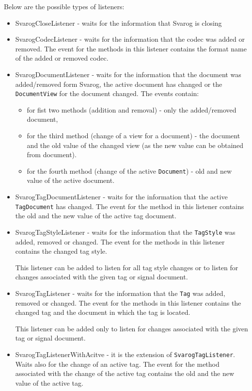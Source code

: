 \documentclass{article}
\begin{document}
Below are the possible types of listeners:
\begin{itemize}
	\item SvarogCloseListener - waits for the information that Svarog is closing
	\item SvarogCodecListener - waits for the information that the codec was added or removed.
		The event for the methods in this listener contains the format name of the added or removed codec.
	\item SvarogDocumentListener - waits for the information that the document was added/removed form Svarog,
		the active document has changed or the \verb=DocumentView= for the document changed.
		The events contain:
		\begin{itemize}
			\item for fist two methods (addition and removal) - only the added/removed document,
			\item for the third method (change of a view for a document) - the document and the old value of the changed view
				(as the new value can be obtained from document).
			\item for the fourth method (change of the active \verb=Document=) - old and new value of the active document.
		\end{itemize}
	\item SvarogTagDocumentListener - waits for the information that the active \verb=TagDocument= has changed.
		The event for the method in this listener contains the old and the new value of the active tag document.
	\item SvarogTagStyleListener - waits for the information that the \verb=TagStyle= was added, removed or changed.
		The event for the methods in this listener contains the changed tag style.
		
		This listener can be added to listen for all tag style changes or to listen for changes associated with the given
		tag or signal document.
	\item SvarogTagListener - waits for the information that the \verb=Tag= was added, removed or changed.
		The event for the methods in this listener contains the changed tag and the document in which the tag is located.
		
		This listener can be added only to listen for changes associated with the given	tag or signal document.
	\item SvarogTagListenerWithAcitve - it is the extension of \verb=SvarogTagListener=. Waits also for the change of an
		active tag.
		The event for the method associated with the change of the active tag contains the old and the new value of the active tag.
\end{itemize}
\end{document}
